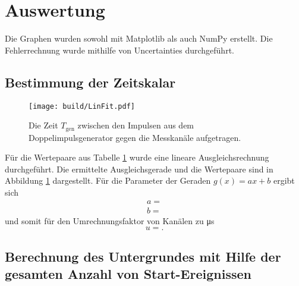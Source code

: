 \section{Auswertung}
\label{sec:Auswertung}


Die Graphen wurden sowohl mit Matplotlib \cite{matplotlib} als auch NumPy \cite{numpy} erstellt. Die
Fehlerrechnung wurde mithilfe von Uncertainties \cite{uncertainties} durchgeführt.


\subsection{Bestimmung der Zeitskalar}
\begin{figure}
	\centering
	\texttt{[image: build/LinFit.pdf]}
	\caption{Die Zeit $T_\text{gen}$ zwischen den Impulsen aus dem Doppelimpulsgenerator gegen die Messkanäle aufgetragen.}
	\label{fig:erste}
\end{figure}
Für die Wertepaare aus Tabelle \ref{sec:Auswertung}  wurde eine lineare Ausgleichsrechnung durchgeführt. Die ermittelte Ausgleichsgerade und die Wertepaare sind in Abbildung \ref{fig:erste} dargestellt. Für die Parameter der Geraden $g(x)=a x + b$ ergibt sich
\begin{gather*}
a=\num{}\\
b=\num{}
\end{gather*}
und somit für den Umrechnungsfaktor von Kanälen zu \si{\micro\second}
\begin{displaymath}
u=\num{}.
\end{displaymath}
\subsection{Berechnung des Untergrundes mit Hilfe der gesamten Anzahl von Start-Ereignissen}

